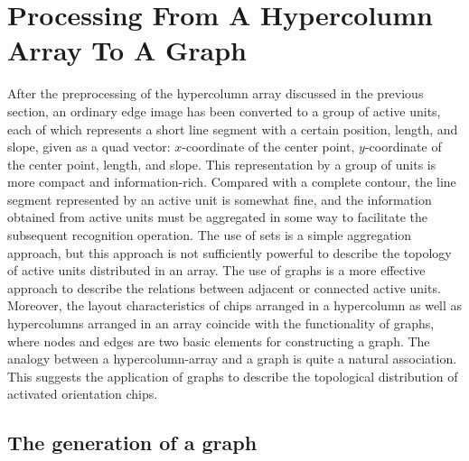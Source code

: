 \documentclass[journal]{IEEEtran}
\begin{document}
\section{Processing From A Hypercolumn Array To A Graph}

After the preprocessing of the hypercolumn array discussed in the previous section, 
an ordinary edge image has been converted to a group of active units, 
each of which represents a short line segment with a certain position, length, and slope, 
given as a quad vector: $x$-coordinate of the center point, 
$y$-coordinate of the center point, length, and slope. 
This representation by a group of units is more compact and information-rich. 
Compared with a complete contour, the line segment represented by an active unit is somewhat fine, 
and the information obtained from active units must be aggregated in some way to facilitate the subsequent recognition operation. 
The use of sets is a simple aggregation approach, 
but this approach is not sufficiently powerful to describe the topology of active units distributed in an array. 
The use of graphs is a more effective approach to describe the relations between adjacent or connected active units. 
Moreover, the layout characteristics of chips arranged in a hypercolumn as well as hypercolumns arranged in an array coincide with the functionality of graphs, 
where nodes and edges are two basic elements for constructing a graph. 
The analogy between a hypercolumn-array and a graph is quite a natural association. 
This suggests the application of graphs to describe the topological distribution of activated orientation chips.

\subsection{The generation of a graph}
\end{document}
